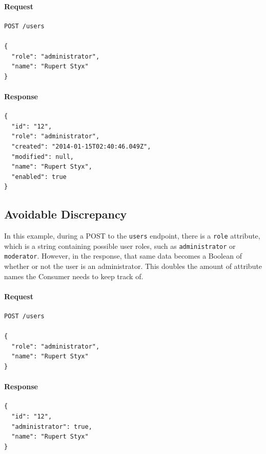 \documentclass{book}
\begin{document}
\paragraph{\textbf{Request}}

\begin{verbatim}
POST /users

{
  "role": "administrator",
  "name": "Rupert Styx"
}
\end{verbatim}

\paragraph{\textbf{Response}}

\begin{verbatim}
{
  "id": "12",
  "role": "administrator",
  "created": "2014-01-15T02:40:46.049Z",
  "modified": null,
  "name": "Rupert Styx",
  "enabled": true
}
\end{verbatim}

\subsection{Avoidable Discrepancy}

In this example, during a POST to the \texttt{users} endpoint, there is a \texttt{role} attribute, which is a string containing possible user roles, such as \texttt{administrator} or \texttt{moderator}. However, in the response, that same data becomes a Boolean of whether or not the user is an administrator. This doubles the amount of attribute names the Consumer needs to keep track of.

\paragraph{\textbf{Request}}

\begin{verbatim}
POST /users

{
  "role": "administrator",
  "name": "Rupert Styx"
}
\end{verbatim}

\paragraph{\textbf{Response}}

\begin{verbatim}
{
  "id": "12",
  "administrator": true,
  "name": "Rupert Styx"
}
\end{verbatim}
\end{document}
